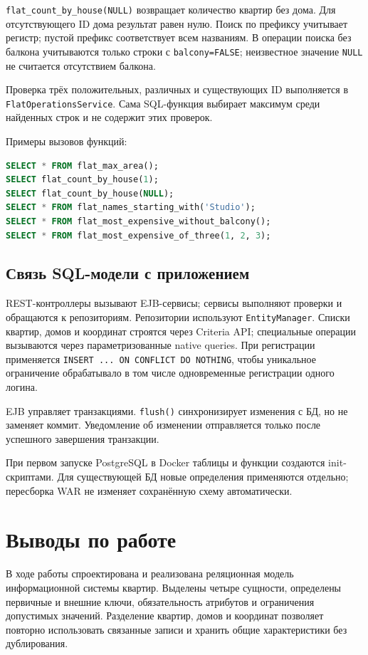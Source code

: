\documentclass[12pt,a4paper]{article}
\begin{document}
\texttt{flat\_count\_by\_house(NULL)} возвращает количество квартир без дома.
Для отсутствующего ID дома результат равен нулю. Поиск по префиксу учитывает
регистр; пустой префикс соответствует всем названиям. В операции поиска
без балкона учитываются только строки с \texttt{balcony=FALSE}; неизвестное
значение \texttt{NULL} не считается отсутствием балкона.

Проверка трёх положительных, различных и существующих ID выполняется в
\texttt{FlatOperationsService}. Сама SQL-функция выбирает максимум среди
найденных строк и не содержит этих проверок.

Примеры вызовов функций:
\begin{lstlisting}[language=SQL]
SELECT * FROM flat_max_area();
SELECT flat_count_by_house(1);
SELECT flat_count_by_house(NULL);
SELECT * FROM flat_names_starting_with('Studio');
SELECT * FROM flat_most_expensive_without_balcony();
SELECT * FROM flat_most_expensive_of_three(1, 2, 3);
\end{lstlisting}

\subsection{Связь SQL-модели с приложением}

REST-контроллеры вызывают EJB-сервисы; сервисы выполняют проверки и обращаются
к репозиториям. Репозитории используют \texttt{EntityManager}. Списки квартир,
домов и координат строятся через Criteria API; специальные операции вызываются
через параметризованные native queries. При регистрации применяется
\texttt{INSERT ... ON CONFLICT DO NOTHING}, чтобы уникальное ограничение
обрабатывало в том числе одновременные регистрации одного логина.

EJB управляет транзакциями. \texttt{flush()} синхронизирует изменения с БД,
но не заменяет коммит. Уведомление об изменении отправляется только после
успешного завершения транзакции.

При первом запуске PostgreSQL в Docker таблицы и функции создаются init-скриптами.
Для существующей БД новые определения применяются отдельно; пересборка WAR
не изменяет сохранённую схему автоматически.

\section{Выводы по работе}

В ходе работы спроектирована и реализована реляционная модель информационной
системы квартир. Выделены четыре сущности, определены первичные и внешние ключи,
обязательность атрибутов и ограничения допустимых значений. Разделение квартир,
домов и координат позволяет повторно использовать связанные записи и хранить
общие характеристики без дублирования.
\end{document}
